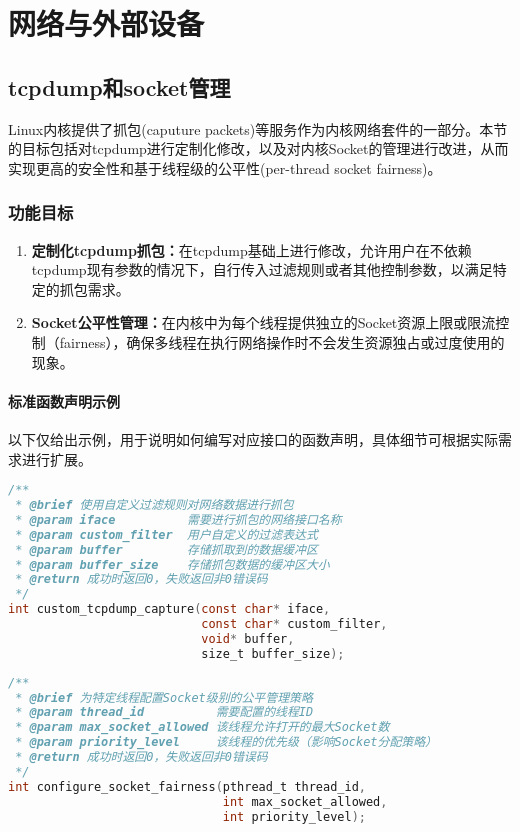 \chapter{网络与外部设备}

\section{tcpdump和socket管理}
Linux内核提供了抓包(caputure packets)等服务作为内核网络套件的一部分。本节的目标包括对tcpdump进行定制化修改，以及对内核Socket的管理进行改进，从而实现更高的安全性和基于线程级的公平性(per-thread socket fairness)。

\subsection{功能目标}
\begin{enumerate}
    \item \textbf{定制化tcpdump抓包：}在tcpdump基础上进行修改，允许用户在不依赖tcpdump现有参数的情况下，自行传入过滤规则或者其他控制参数，以满足特定的抓包需求。
    \item \textbf{Socket公平性管理：}在内核中为每个线程提供独立的Socket资源上限或限流控制（fairness），确保多线程在执行网络操作时不会发生资源独占或过度使用的现象。
\end{enumerate}

\subsubsection{标准函数声明示例}
以下仅给出示例，用于说明如何编写对应接口的函数声明，具体细节可根据实际需求进行扩展。

\begin{lstlisting}[language=C, caption={示例：自定义tcpdump抓包接口}]
/**
 * @brief 使用自定义过滤规则对网络数据进行抓包
 * @param iface          需要进行抓包的网络接口名称
 * @param custom_filter  用户自定义的过滤表达式
 * @param buffer         存储抓取到的数据缓冲区
 * @param buffer_size    存储抓包数据的缓冲区大小
 * @return 成功时返回0，失败返回非0错误码
 */
int custom_tcpdump_capture(const char* iface, 
                           const char* custom_filter, 
                           void* buffer, 
                           size_t buffer_size);
\end{lstlisting}

\begin{lstlisting}[language=C, caption={示例：线程级别Socket公平性管理接口}]
/**
 * @brief 为特定线程配置Socket级别的公平管理策略
 * @param thread_id          需要配置的线程ID
 * @param max_socket_allowed 该线程允许打开的最大Socket数
 * @param priority_level     该线程的优先级（影响Socket分配策略）
 * @return 成功时返回0，失败返回非0错误码
 */
int configure_socket_fairness(pthread_t thread_id, 
                              int max_socket_allowed, 
                              int priority_level);
\end{lstlisting}

